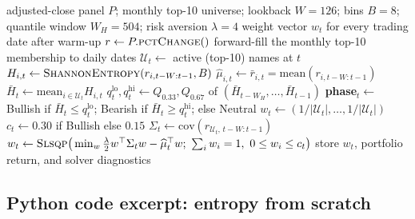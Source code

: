 \documentclass[a4paper,12pt]{article}
\begin{document}
\begin{algorithm}[H]
\caption{Daily regime-driven allocation (SLSQP in Bullish/Neutral, equal weight in Bearish)}
\begin{algorithmic}[1]
\Require adjusted-close panel $P$; monthly top-10 universe; lookback $W=126$; bins $B=8$; quantile window $W_H=504$; risk aversion $\lambda=4$
\Ensure weight vector $w_t$ for every trading date after warm-up
\State $r \gets P.\textsc{pctChange}()$ 
\State forward-fill the monthly top-10 membership to daily dates
    \State $\mathcal{U}_t \gets$ active (top-10) names at $t$
        \State $H_{i,t}\gets\textsc{ShannonEntropy}(r_{i,t-W:t-1},B)$ 
        \State $\widehat{\mu}_{i,t}\gets \bar r_{i,t}=\mathrm{mean}(r_{i,t-W:t-1})$ 
    \EndFor
    \State $\bar H_t\gets \mathrm{mean}_{i\in\mathcal{U}_t} H_{i,t}$ 
    \State $q^{\mathrm{lo}}_t,q^{\mathrm{hi}}_t\gets Q_{0.33},Q_{0.67}$ of $(\bar H_{t-W_H},\ldots,\bar H_{t-1})$
    \State \textbf{phase}$_t\gets$ Bullish if $\bar H_t\le q^{\mathrm{lo}}_t$; Bearish if $\bar H_t\ge q^{\mathrm{hi}}_t$; else Neutral
        \State $w_t\gets (1/|\mathcal{U}_t|,\ldots,1/|\mathcal{U}_t|)$ 
    \Else
        \State $c_t\gets 0.30$ if Bullish else $0.15$ 
        \State $\Sigma_t\gets \mathrm{cov}(r_{\mathcal{U}_t,\,t-W:t-1})$ 
        \State $w_t\gets \textsc{Slsqp}\big(\min_w \tfrac{\lambda}{2}w^\top\Sigma_t w-\widehat{\mu}_t^\top w;\ \textstyle\sum_i w_i=1,\ 0\le w_i\le c_t\big)$
    \EndIf
    \State store $w_t$, portfolio return, and solver diagnostics
\EndFor
\end{algorithmic}
\end{algorithm}

\subsection{Python code excerpt: entropy from scratch}
\end{document}
